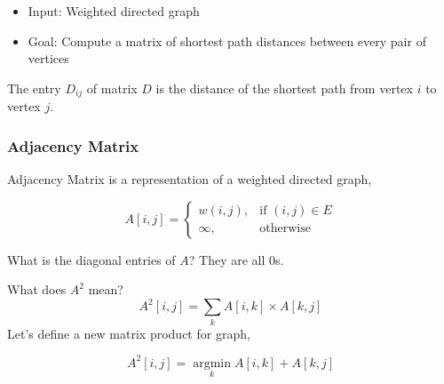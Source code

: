 \begin{itemize}
	\item Input: Weighted directed graph
	\item Goal: Compute a matrix of shortest path distances between every pair of vertices
\end{itemize}

The entry $D_{ij}$ of matrix $D$ is the distance of the shortest path from vertex $i$ to vertex $j$.

\subsubsection{Adjacency Matrix}
Adjacency Matrix is a representation of a weighted directed graph,

\[
	A[i, j]= 
		\begin{cases}
			w(i,j),& \text{if } (i, j)\in E\\
			\infty,              & \text{otherwise}
		\end{cases}
\]

What is the diagonal entries of $A$? They are all 0s.

What does $A^2$ mean?
\[
	A^2[i, j] = \sum_k A[i,k] \times A[k, j]
\]
Let's define a new matrix product for graph,

\[
	A^2[i, j] = \operatorname*{argmin}_k A[i,k] + A[k, j]
\]